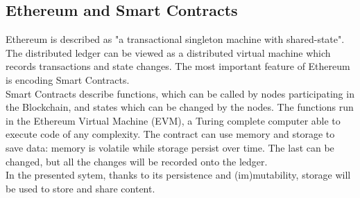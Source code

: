 \documentclass[hidelinks,conference,compsoc]{IEEEtran}
\begin{document}
\subsection{Ethereum and Smart Contracts}
Ethereum \cite{wood2014ethereum} is described as "a transactional singleton machine with shared-state". 
The distributed ledger can be viewed as a distributed virtual machine which records transactions and state changes.
The most important feature of Ethereum is encoding Smart Contracts.\\
Smart Contracts describe functions, which can be called by nodes participating in the Blockchain, and states which can be changed by the nodes. 
The functions run in the Ethereum Virtual Machine (EVM),
a Turing complete computer able to execute code of any complexity.
The contract can use memory and storage to save data: %
memory is volatile while storage persist over time. The last can be changed, but all the changes will be recorded onto the ledger.\\
In the presented sytem, thanks to its persistence and (im)mutability, storage will be used to store and share content. 
\end{document}
